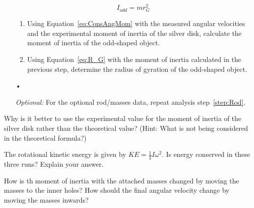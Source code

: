\documentclass[main.tex]{subfiles}
\begin{document}
\begin{enumerate}
\begin{equation} \label{eq:R_G}
I_{odd}=mr_G^2
\end{equation}
\begin{enumerate}
\item
Using Equation~\eqref{eq:ConsAngMom} with the measured angular velocities and the experimental moment of inertia of the silver disk, calculate the moment of inertia of the odd-shaped object.
\item
Using Equation~\eqref{eq:R_G} with the moment of inertia calculated in the previous step, determine the radius of gyration of the odd-shaped object.
\end{enumerate}•
\item[\emph{Optional:}]
For the optional rod/masses data, repeat analysis step~\ref{step:Rod}.
\end{enumerate}

\begin{question}
Why is it better to use the experimental value for the moment of inertia of the silver disk rather than the theoretical value? (Hint: What is not being considered in the theoretical formula?)
\end{question}
\begin{question}
The rotational kinetic energy is given by $KE=\frac{1}{2}I\omega^2.$ Is energy conserved in these three runs? Explain your answer.
\end{question}
\begin{question}
How is th moment of inertia with the attached masses changed by moving the masses to the inner holes? How should the final angular velocity change by moving the masses inwards?
\end{question}
\end{document}
